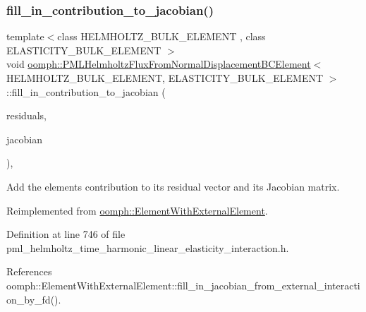 \subsubsection{\texorpdfstring{fill\+\_\+in\+\_\+contribution\+\_\+to\+\_\+jacobian()}{fill\_in\_contribution\_to\_jacobian()}}
{\footnotesize\ttfamily template$<$class H\+E\+L\+M\+H\+O\+L\+T\+Z\+\_\+\+B\+U\+L\+K\+\_\+\+E\+L\+E\+M\+E\+NT , class E\+L\+A\+S\+T\+I\+C\+I\+T\+Y\+\_\+\+B\+U\+L\+K\+\_\+\+E\+L\+E\+M\+E\+NT $>$ \\
void \hyperlink{classoomph_1_1PMLHelmholtzFluxFromNormalDisplacementBCElement}{oomph\+::\+P\+M\+L\+Helmholtz\+Flux\+From\+Normal\+Displacement\+B\+C\+Element}$<$ H\+E\+L\+M\+H\+O\+L\+T\+Z\+\_\+\+B\+U\+L\+K\+\_\+\+E\+L\+E\+M\+E\+NT, E\+L\+A\+S\+T\+I\+C\+I\+T\+Y\+\_\+\+B\+U\+L\+K\+\_\+\+E\+L\+E\+M\+E\+NT $>$\+::fill\+\_\+in\+\_\+contribution\+\_\+to\+\_\+jacobian (\begin{DoxyParamCaption}\item[{\hyperlink{classoomph_1_1Vector}{Vector}$<$ double $>$ \&}]{residuals,  }\item[{\hyperlink{classoomph_1_1DenseMatrix}{Dense\+Matrix}$<$ double $>$ \&}]{jacobian }\end{DoxyParamCaption})\hspace{0.3cm}{\ttfamily [inline]}, {\ttfamily [virtual]}}



Add the element\textquotesingle{}s contribution to its residual vector and its Jacobian matrix. 



Reimplemented from \hyperlink{classoomph_1_1ElementWithExternalElement_ae5fb09552a8271e891438f8d058ca1b8}{oomph\+::\+Element\+With\+External\+Element}.



Definition at line 746 of file pml\+\_\+helmholtz\+\_\+time\+\_\+harmonic\+\_\+linear\+\_\+elasticity\+\_\+interaction.\+h.



References oomph\+::\+Element\+With\+External\+Element\+::fill\+\_\+in\+\_\+jacobian\+\_\+from\+\_\+external\+\_\+interaction\+\_\+by\+\_\+fd().

\mbox{\label{classoomph_1_1PMLHelmholtzFluxFromNormalDisplacementBCElement_ab43c2c8e318060cf808329b1c147a333}} 
